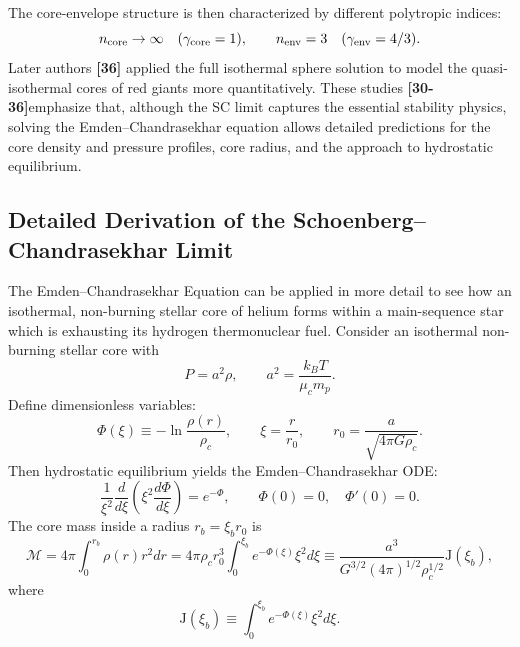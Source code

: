 \documentclass[12pt,a4paper]{article}
\numberwithin{equation}{section}
\begin{document}
The core-envelope structure is then characterized by different polytropic indices:
\begin{equation}
n_{\rm core} \to \infty \quad (\gamma_{\rm core}=1), \qquad n_{\rm env} = 3 \quad (\gamma_{\rm env}=4/3).
\end{equation}
Later authors \textbf{[36]} applied the full isothermal sphere solution to model the quasi-isothermal cores of red giants more quantitatively. These studies \textbf{[30-36]}emphasize that, although the SC limit captures the essential stability physics, solving the Emden--Chandrasekhar equation allows detailed predictions for the core density and pressure profiles, core radius, and the approach to hydrostatic equilibrium.

\subsection{Detailed Derivation of the Schoenberg--Chandrasekhar Limit}
The Emden--Chandrasekhar Equation can be applied in more detail to see how an isothermal, non-burning stellar core of helium forms within a main-sequence star which is exhausting its hydrogen thermonuclear fuel. Consider an isothermal non-burning stellar core with
\begin{equation}
P = a^2 \rho, \qquad a^2 = \frac{k_B T}{\mu_c m_p}.
\end{equation}
Define dimensionless variables:
\begin{equation}
\Phi(\xi) \equiv -\ln\frac{\rho(r)}{\rho_c},
\qquad
\xi = \frac{r}{r_0},
\qquad
r_0 = \frac{a}{\sqrt{4\pi G \rho_c}}.
\end{equation}
Then hydrostatic equilibrium yields the Emden--Chandrasekhar ODE:
\begin{equation}
\frac{1}{\xi^2} \frac{d}{d\xi}\left(\xi^2 \frac{d\Phi}{d\xi}\right) = e^{-\Phi},
\qquad
\Phi(0) = 0, \quad \Phi'(0) = 0.
\end{equation}
The core mass inside a radius $r_b = \xi_b r_0$ is
\begin{equation}
\mathcal{M} = 4\pi \int_0^{r_b} \rho(r) r^2 dr
= 4 \pi \rho_c r_0^3 \int_0^{\xi_b} e^{-\Phi(\xi)} \xi^2 d\xi
\equiv \frac{a^3}{G^{3/2} (4\pi)^{1/2} \rho_c^{1/2}} \mathrm{J}(\xi_b),
\end{equation}
where
\begin{equation}
\mathrm{J}(\xi_b) \equiv \int_0^{\xi_b} e^{-\Phi(\xi)} \xi^2 d\xi.
\end{equation}
\end{document}
